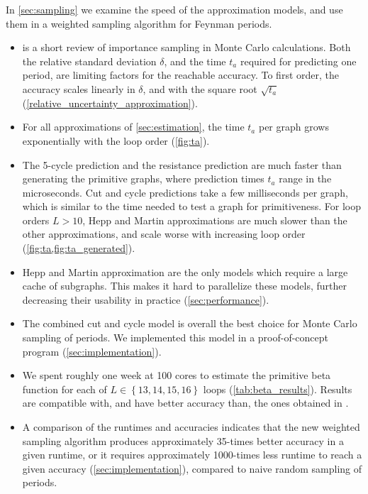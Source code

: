 \documentclass[12pt]{article}
\numberwithin{equation}{section}
\begin{document}
\medskip
\noindent
In \cref{sec:sampling} we examine the speed of the approximation models, and   use them in a weighted sampling algorithm for Feynman periods. 
\begin{itemize}
	\item {} is a short review of importance sampling in Monte Carlo calculations.  Both the relative standard deviation $\delta$, and the time  $t_a$ required for predicting one period, are limiting factors for the reachable accuracy. To first order, the accuracy scales linearly in $\delta$, and with the square root $\sqrt{t_a}$ (\cref{relative_uncertainty_approximation}).
	\item For all approximations of \cref{sec:estimation}, the time $t_a$ per graph grows exponentially with the loop order (\cref{fig:ta}). 
	\item The 5-cycle prediction and the resistance prediction are much faster than generating the primitive graphs, where prediction times $t_a$ range in the microseconds. Cut and cycle predictions  take a few milliseconds per graph, which is similar to the time needed to test a graph for primitiveness. For  loop orders $L >10$, Hepp and Martin approximations are much slower than the other approximations, and scale worse with increasing loop order (\cref{fig:ta,fig:ta_generated}).
	\item Hepp and Martin approximation are the only models which require a large cache of subgraphs. This makes it hard to parallelize these models, further decreasing their usability in practice (\cref{sec:performance}).
	\item The combined cut and cycle model is overall the best choice for Monte Carlo sampling of periods. We implemented this model in a proof-of-concept program (\cref{sec:implementation}).
	\item We spent roughly one week at 100 cores to estimate the primitive beta function for each of $L\in \left \lbrace 13,14,15,16 \right \rbrace $ loops (\cref{tab:beta_results}). Results are compatible with, and have better accuracy than, the ones obtained in   \cite{balduf_statistics_2023}.
	\item  A  comparison of the runtimes and accuracies indicates that the new weighted sampling algorithm produces approximately 35-times better accuracy in a given runtime, or it requires approximately 1000-times less runtime to reach a given accuracy (\cref{sec:implementation}), compared to naive random sampling of periods.
\end{itemize}
\end{document}
